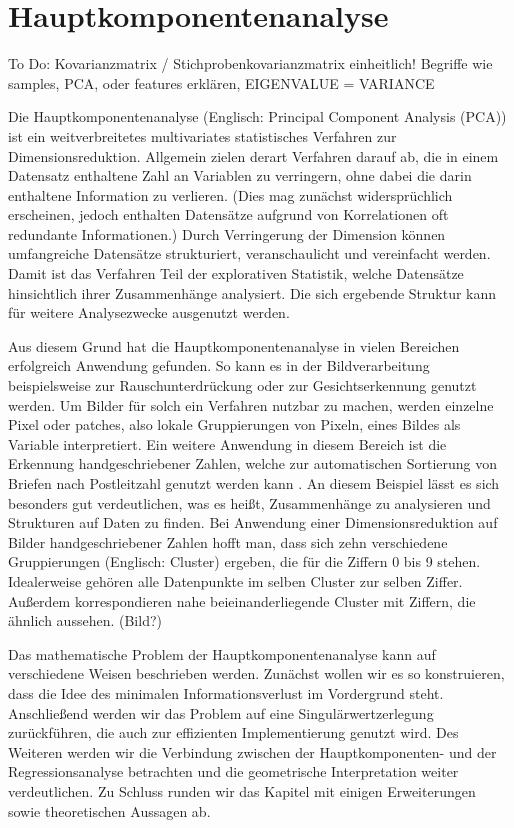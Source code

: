 \chapter{Hauptkomponentenanalyse}

\label{pca}

To Do: Kovarianzmatrix / Stichprobenkovarianzmatrix einheitlich!
Begriffe wie samples, PCA, oder features erklären, EIGENVALUE = VARIANCE

Die Hauptkomponentenanalyse (Englisch: Principal Component Analysis (PCA)) ist ein weitverbreitetes multivariates statistisches Verfahren zur Dimensionsreduktion. Allgemein zielen derart Verfahren darauf ab, die in einem Datensatz enthaltene Zahl an Variablen zu verringern, ohne dabei die darin enthaltene Information zu verlieren. (Dies mag zunächst widersprüchlich erscheinen, jedoch enthalten Datensätze aufgrund von Korrelationen oft redundante Informationen.) Durch Verringerung der Dimension können umfangreiche Datensätze strukturiert, veranschaulicht und vereinfacht werden. Damit ist das Verfahren Teil der explorativen Statistik, welche Datensätze hinsichtlich ihrer Zusammenhänge analysiert. Die sich ergebende Struktur kann für weitere Analysezwecke ausgenutzt werden.

Aus diesem Grund hat die Hauptkomponentenanalyse in vielen Bereichen erfolgreich Anwendung gefunden. So kann es in der Bildverarbeitung beispielsweise zur Rauschunterdrückung \cite{babu} oder zur Gesichtserkennung \cite{jiang} genutzt werden. Um Bilder für solch ein Verfahren nutzbar zu machen, werden einzelne Pixel oder patches, also lokale Gruppierungen von Pixeln, eines Bildes als Variable interpretiert. Ein weitere Anwendung in diesem Bereich ist die Erkennung handgeschriebener Zahlen, welche zur automatischen Sortierung von Briefen nach Postleitzahl genutzt werden kann \cite{hastie_elements}. An diesem Beispiel lässt es sich besonders gut verdeutlichen, was es heißt, Zusammenhänge zu analysieren und Strukturen auf Daten zu finden. Bei Anwendung einer Dimensionsreduktion auf Bilder handgeschriebener Zahlen hofft man, dass sich zehn verschiedene Gruppierungen (Englisch: Cluster) ergeben, die für die Ziffern 0 bis 9 stehen. Idealerweise gehören alle Datenpunkte im selben Cluster zur selben Ziffer. Außerdem korrespondieren nahe beieinanderliegende Cluster mit Ziffern, die ähnlich aussehen. (Bild?)

Das mathematische Problem der Hauptkomponentenanalyse kann auf verschiedene Weisen beschrieben werden. Zunächst wollen wir es so konstruieren, dass die Idee des minimalen Informationsverlust im Vordergrund steht. Anschließend werden wir das Problem auf eine Singulärwertzerlegung zurückführen, die auch zur effizienten Implementierung genutzt wird. Des Weiteren werden wir die Verbindung zwischen der Hauptkomponenten- und der Regressionsanalyse betrachten und die geometrische Interpretation weiter verdeutlichen. Zu Schluss runden wir das Kapitel mit einigen Erweiterungen sowie theoretischen Aussagen ab.


